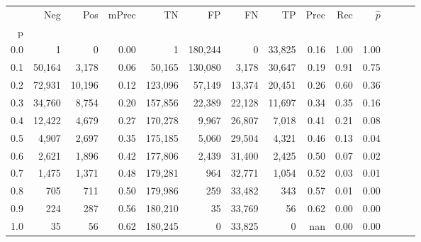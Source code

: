\begin{tabular}{rrrrrrrrrrrrrr}
\toprule
{} &     Neg &     Pos & mPrec &       TN &       FP &      FN &      TP &  Prec &   Rec & $\hat{p}$ \\
p   &         &         &       &          &          &         &         &       &       &           \\
\midrule
0.0 &       1 &       0 &  0.00 &        1 &  180,244 &       0 &  33,825 &  0.16 &  1.00 &      1.00 \\
0.1 &  50,164 &   3,178 &  0.06 &   50,165 &  130,080 &   3,178 &  30,647 &  0.19 &  0.91 &      0.75 \\
0.2 &  72,931 &  10,196 &  0.12 &  123,096 &   57,149 &  13,374 &  20,451 &  0.26 &  0.60 &      0.36 \\
0.3 &  34,760 &   8,754 &  0.20 &  157,856 &   22,389 &  22,128 &  11,697 &  0.34 &  0.35 &      0.16 \\
0.4 &  12,422 &   4,679 &  0.27 &  170,278 &    9,967 &  26,807 &   7,018 &  0.41 &  0.21 &      0.08 \\
0.5 &   4,907 &   2,697 &  0.35 &  175,185 &    5,060 &  29,504 &   4,321 &  0.46 &  0.13 &      0.04 \\
0.6 &   2,621 &   1,896 &  0.42 &  177,806 &    2,439 &  31,400 &   2,425 &  0.50 &  0.07 &      0.02 \\
0.7 &   1,475 &   1,371 &  0.48 &  179,281 &      964 &  32,771 &   1,054 &  0.52 &  0.03 &      0.01 \\
0.8 &     705 &     711 &  0.50 &  179,986 &      259 &  33,482 &     343 &  0.57 &  0.01 &      0.00 \\
0.9 &     224 &     287 &  0.56 &  180,210 &       35 &  33,769 &      56 &  0.62 &  0.00 &      0.00 \\
1.0 &      35 &      56 &  0.62 &  180,245 &        0 &  33,825 &       0 &   nan &  0.00 &      0.00 \\
\bottomrule
\end{tabular}
